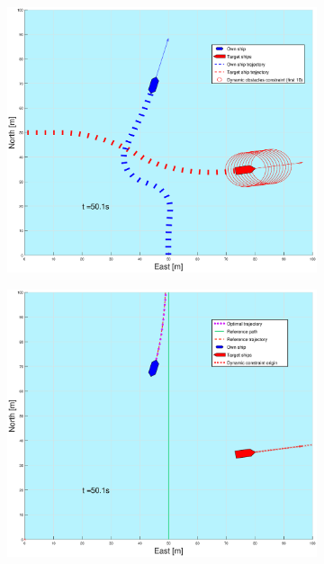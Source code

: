\begin{figure}[ht]\ContinuedFloat
    \begin{subfigure}[b]{0.49\textwidth}
        \centering
        \includegraphics[width=\textwidth]{Images/Figures/enkel_SO/_Simple_1fig1_time=50}
    \end{subfigure}
    \hfill
    \begin{subfigure}[b]{0.499\textwidth}
        \centering
        \includegraphics[width=\textwidth]{Images/Figures/enkel_SO/_Simple_1fig999_time=50}

\end{subfigure}
\end{figure}

